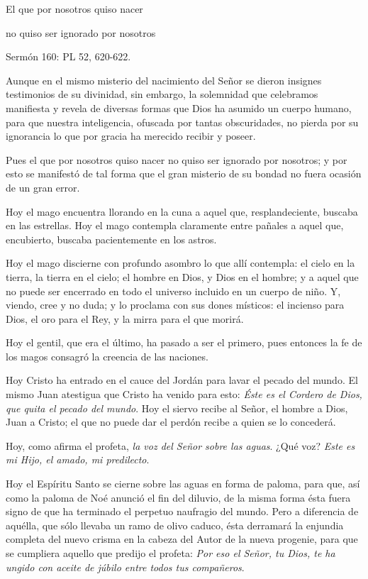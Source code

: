 \begin{body}
\begin{body}
{El que por nosotros quiso nacer

no quiso ser ignorado por nosotros

Sermón 160: PL 52, 620-622.

Aunque en el mismo misterio del nacimiento del Señor se dieron insignes testimonios de su divinidad, sin embargo, la solemnidad que celebramos manifiesta y revela de diversas formas que Dios ha asumido un cuerpo humano, para que nuestra inteligencia, ofuscada por tantas obscuridades, no pierda por su ignorancia lo que por gracia ha merecido recibir y poseer.

Pues el que por nosotros quiso nacer no quiso ser ignorado por nosotros; y por esto se manifestó de tal forma que el gran misterio de su bondad no fuera ocasión de un gran error.

Hoy el mago encuentra llorando en la cuna a aquel que, resplandeciente, buscaba en las estrellas. Hoy el mago contempla claramente entre pañales a aquel que, encubierto, buscaba pacientemente en los astros.

Hoy el mago discierne con profundo asombro lo que allí contempla: el cielo en la tierra, la tierra en el cielo; el hombre en Dios, y Dios en el hombre; y a aquel que no puede ser encerrado en todo el universo incluido en un cuerpo de niño. Y, viendo, cree y no duda; y lo proclama con sus dones místicos: el incienso para Dios, el oro para el Rey, y la mirra para el que morirá.

Hoy el gentil, que era el último, ha pasado a ser el primero, pues entonces la fe de los magos consagró la creencia de las naciones.

Hoy Cristo ha entrado en el cauce del Jordán para lavar el pecado del mundo. El mismo Juan atestigua que Cristo ha venido para esto: \emph{Éste es el Cordero de Dios, que quita el pecado del mundo}. Hoy el siervo recibe al Señor, el hombre a Dios, Juan a Cristo; el que no puede dar el perdón recibe a quien se lo concederá.

Hoy, como afirma el profeta, \emph{la voz del Señor sobre las aguas}. ¿Qué voz? \emph{Este es mi Hijo, el amado, mi predilecto}.

Hoy el Espíritu Santo se cierne sobre las aguas en forma de paloma, para que, así como la paloma de Noé anunció el fin del diluvio, de la misma forma ésta fuera signo de que ha terminado el perpetuo naufragio del mundo. Pero a diferencia de aquélla, que sólo llevaba un ramo de olivo caduco, ésta derramará la enjundia completa del nuevo crisma en la cabeza del Autor de la nueva progenie, para que se cumpliera aquello que predijo el profeta: \emph{Por eso el Señor, tu Dios, te ha ungido con aceite de júbilo entre todos tus compañeros}.

}
\end{body}
\end{body}
